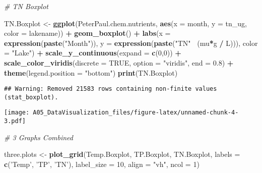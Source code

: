\documentclass[]{article}
\newenvironment{Shaded}{\begin{snugshade}}{\end{snugshade}}
\newcommand{\KeywordTok}[1]{\textcolor[rgb]{0.13,0.29,0.53}{\textbf{#1}}}
\newcommand{\DataTypeTok}[1]{\textcolor[rgb]{0.13,0.29,0.53}{#1}}
\newcommand{\DecValTok}[1]{\textcolor[rgb]{0.00,0.00,0.81}{#1}}
\newcommand{\FloatTok}[1]{\textcolor[rgb]{0.00,0.00,0.81}{#1}}
\newcommand{\StringTok}[1]{\textcolor[rgb]{0.31,0.60,0.02}{#1}}
\newcommand{\CommentTok}[1]{\textcolor[rgb]{0.56,0.35,0.01}{\textit{#1}}}
\newcommand{\OtherTok}[1]{\textcolor[rgb]{0.56,0.35,0.01}{#1}}
\newcommand{\OperatorTok}[1]{\textcolor[rgb]{0.81,0.36,0.00}{\textbf{#1}}}
\newcommand{\NormalTok}[1]{#1}
\begin{document}
\begin{Shaded}
\begin{Highlighting}[]
\CommentTok{# TN Boxplot}

\NormalTok{TN.Boxplot <-}\StringTok{ }
\StringTok{  }\KeywordTok{ggplot}\NormalTok{(PeterPaul.chem.nutrients, }\KeywordTok{aes}\NormalTok{(}\DataTypeTok{x =}\NormalTok{ month, }\DataTypeTok{y =}\NormalTok{ tn_ug, }\DataTypeTok{color =}\NormalTok{ lakename)) }\OperatorTok{+}
\StringTok{  }\KeywordTok{geom_boxplot}\NormalTok{() }\OperatorTok{+}
\StringTok{  }\KeywordTok{labs}\NormalTok{(}\DataTypeTok{x =} \KeywordTok{expression}\NormalTok{(}\KeywordTok{paste}\NormalTok{(}\StringTok{"Month"}\NormalTok{)),}
       \DataTypeTok{y =} \KeywordTok{expression}\NormalTok{(}\KeywordTok{paste}\NormalTok{(}\StringTok{"TN"}\OperatorTok{~}\StringTok{ }\NormalTok{(mu}\OperatorTok{*}\NormalTok{g }\OperatorTok{/}\StringTok{ }\NormalTok{L))), }\DataTypeTok{color =} \StringTok{"Lake"}\NormalTok{) }\OperatorTok{+}
\StringTok{   }\KeywordTok{scale_y_continuous}\NormalTok{(}\DataTypeTok{expand =} \KeywordTok{c}\NormalTok{(}\DecValTok{0}\NormalTok{,}\DecValTok{0}\NormalTok{)) }\OperatorTok{+}
\StringTok{  }\KeywordTok{scale_color_viridis}\NormalTok{(}\DataTypeTok{discrete =} \OtherTok{TRUE}\NormalTok{, }\DataTypeTok{option =} \StringTok{"viridis"}\NormalTok{, }\DataTypeTok{end =} \FloatTok{0.8}\NormalTok{) }\OperatorTok{+}
\StringTok{  }\KeywordTok{theme}\NormalTok{(}\DataTypeTok{legend.position =} \StringTok{"bottom"}\NormalTok{)}
\KeywordTok{print}\NormalTok{(TN.Boxplot)}
\end{Highlighting}
\end{Shaded}

\begin{verbatim}
## Warning: Removed 21583 rows containing non-finite values (stat_boxplot).
\end{verbatim}

\texttt{[image: A05\_DataVisualization\_files/figure-latex/unnamed-chunk-4-3.pdf]}

\begin{Shaded}
\begin{Highlighting}[]
\CommentTok{# 3 Graphs Combined}

\NormalTok{three.plots <-}\StringTok{ }\KeywordTok{plot_grid}\NormalTok{(Temp.Boxplot, TP.Boxplot, TN.Boxplot, }\DataTypeTok{labels =} \KeywordTok{c}\NormalTok{(}\StringTok{'Temp'}\NormalTok{, }\StringTok{'TP'}\NormalTok{, }\StringTok{'TN'}\NormalTok{), }
                         \DataTypeTok{label_size =} \DecValTok{10}\NormalTok{, }\DataTypeTok{align =} \StringTok{"vh"}\NormalTok{, }\DataTypeTok{ncol =} \DecValTok{1}\NormalTok{)}
\end{Highlighting}
\end{Shaded}
\end{document}
